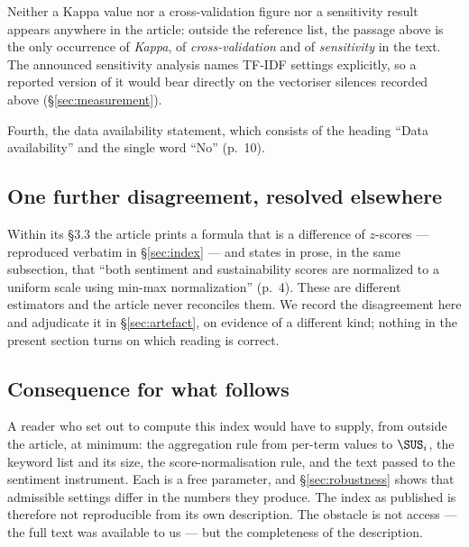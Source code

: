 Neither a Kappa value nor a cross-validation figure nor a sensitivity result appears
anywhere in the article: outside the reference list, the passage above is the only
occurrence of \emph{Kappa}, of \emph{cross-validation} and of \emph{sensitivity} in the
text. The announced sensitivity analysis names TF-IDF settings explicitly, so a reported
version of it would bear directly on the vectoriser silences recorded above
(\S\ref{sec:measurement}).

Fourth, the data availability statement, which consists of the heading ``Data
availability'' and the single word ``No'' (p.~10).

\subsection{One further disagreement, resolved elsewhere}

Within its \S3.3 the article prints a formula that is a difference of $z$-scores ---
reproduced verbatim in \S\ref{sec:index} --- and states in prose, in the same subsection,
that ``both sentiment and sustainability scores are normalized to a uniform scale using
min-max normalization'' (p.~4). These are different estimators and the article never
reconciles them. We record the disagreement here and adjudicate it in
\S\ref{sec:artefact}, on evidence of a different kind; nothing in the present section turns
on which reading is correct.

\subsection{Consequence for what follows}
\label{sec:original-consequence}

A reader who set out to compute this index would have to supply, from outside the article,
at minimum: the aggregation rule from per-term values to $\SUS_i$, the keyword list and its
size, the score-normalisation rule, and the text passed to the sentiment instrument. Each
is a free parameter, and \S\ref{sec:robustness} shows that admissible settings differ in the
numbers they produce. The index as published is therefore not reproducible from its own
description. The obstacle is not access --- the full text was available to us --- but the
completeness of the description.

